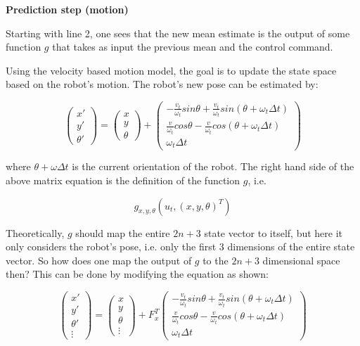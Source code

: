 \documentclass[a4paper]{article}
\begin{document}
\textbf{Prediction step (motion)}

Starting with line 2, one sees that the new mean estimate is the output of some function $g$ that takes as input the previous mean and the control command.

Using the velocity based motion model, the goal is to update the state space based on the robot's motion. The robot's new pose can be estimated by:

\begin{equation*}
    \begin{pmatrix}
    x' \\ y' \\ \theta '
    \end{pmatrix}
    =
    \begin{pmatrix}
    x \\ y \\ \theta
    \end{pmatrix}
    +
    \begin{pmatrix}
    - \frac{v_t}{\omega_t} sin\theta + \frac{v_t}{\omega_t} sin (\theta + \omega_t \Delta t)
    \\ \frac{v}{\omega_t} cos\theta - \frac{v}{\omega_t} cos (\theta + \omega_t \Delta t) 
    \\ \omega_t \Delta t
    \end{pmatrix}
\end{equation*}
    
where $\theta + \omega \Delta t$ is the current orientation of the robot. The right hand side of the above matrix equation is the definition of the function $g$, i.e.
    
\begin{equation*}
    g_{x,y,\theta} (u_t, (x, y, \theta)^T)
\end{equation*}
    
Theoretically, $g$ should map the entire $2n+3$ state vector to itself, but here it only considers the robot's pose, i.e. only the first 3 dimensions of the entire state vector. So how does one map the output of $g$ to the $2n+3$ dimensional space then? This can be done by modifying the equation as shown:

\begin{equation*}
    \begin{pmatrix}
    x' \\ y' \\ \theta ' \\ \vdots
    \end{pmatrix}
    =
    \begin{pmatrix}
    x \\ y \\ \theta \\ \vdots
    \end{pmatrix}
    +
    F_x^T
    \begin{pmatrix}
    - \frac{v_t}{\omega_t} sin\theta + \frac{v_t}{\omega_t} sin (\theta + \omega_t \Delta t)
    \\ \frac{v}{\omega_t} cos\theta - \frac{v}{\omega_t} cos (\theta + \omega_t \Delta t) 
    \\ \omega_t \Delta t
    \end{pmatrix}
\end{equation*}
\end{document}
